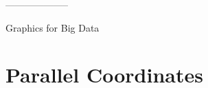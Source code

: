 \documentclass[xcolor=x11names,compress, aspectratio=169]{beamer}
\renewcommand{\(}{\begin{columns}}
\renewcommand{\)}{\end{columns}}
\newcommand{\<}[1]{\begin{column}{#1}}
\renewcommand{\>}{\end{column}}
\begin{document}
--------------------
{
\begin{frame}
\hspace{4cm}
\begin{center}
\Huge{Graphics for Big Data}
\end{center}
\end{frame}

} %

\section{Parallel Coordinates }

\end{document}
